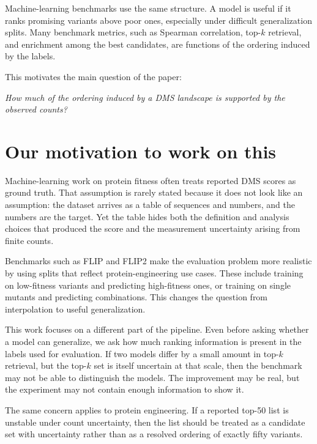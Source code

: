 \documentclass[11pt]{article}
\begin{document}
Machine-learning benchmarks use the same structure. A model is useful if it ranks promising variants above poor ones, especially under difficult generalization splits. Many benchmark metrics, such as Spearman correlation, top-$k$ retrieval, and enrichment among the best candidates, are functions of the ordering induced by the labels.

This motivates the main question of the paper:

\begin{callout}
\begin{center}
  \textit{How much of the ordering induced by a DMS landscape is supported by the observed counts?}
\end{center}
\end{callout}

\section*{Our motivation to work on this}

Machine-learning work on protein fitness often treats reported DMS scores as ground truth. That assumption is rarely stated because it does not look like an assumption: the dataset arrives as a table of sequences and numbers, and the numbers are the target. Yet the table hides both the definition and analysis choices that produced the score and the measurement uncertainty arising from finite counts.

Benchmarks such as FLIP and FLIP2 make the evaluation problem more realistic by using splits that reflect protein-engineering use cases. These include training on low-fitness variants and predicting high-fitness ones, or training on single mutants and predicting combinations. This changes the question from interpolation to useful generalization.

This work focuses on a different part of the pipeline. Even before asking whether a model can generalize, we ask how much ranking information is present in the labels used for evaluation. If two models differ by a small amount in top-$k$ retrieval, but the top-$k$ set is itself uncertain at that scale, then the benchmark may not be able to distinguish the models. The improvement may be real, but the experiment may not contain enough information to show it.

The same concern applies to protein engineering. If a reported top-50 list is unstable under count uncertainty, then the list should be treated as a candidate set with uncertainty rather than as a resolved ordering of exactly fifty variants.
\end{document}
